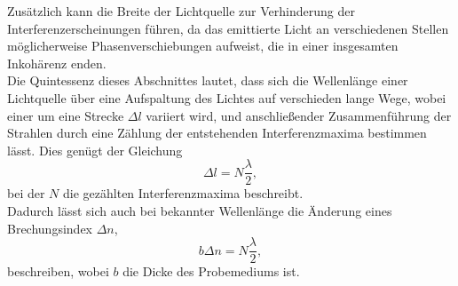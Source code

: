 Zusätzlich kann die Breite der Lichtquelle zur Verhinderung der Interferenzerscheinungen führen, da das emittierte Licht an verschiedenen Stellen möglicherweise Phasenverschiebungen aufweist, die in einer insgesamten Inkohärenz enden.\\
Die Quintessenz dieses Abschnittes lautet, dass sich die Wellenlänge einer Lichtquelle über eine Aufspaltung des Lichtes auf verschieden lange Wege, wobei einer um eine Strecke $\Delta l$ variiert wird, und anschließender Zusammenführung der Strahlen durch eine Zählung der entstehenden Interferenzmaxima bestimmen lässt.
Dies genügt der Gleichung
\begin{equation}
  \Delta l = N\frac{\lambda}{2}, \label{eqn:2}
\end{equation}
bei der $N$ die gezählten Interferenzmaxima beschreibt.\\
Dadurch lässt sich auch bei bekannter Wellenlänge die Änderung eines Brechungsindex $\Delta n$,
\begin{equation}
  b\Delta n = N\frac{\lambda}{2}, \label{eqn:3}
\end{equation}
beschreiben, wobei $b$ die Dicke des Probemediums ist.







